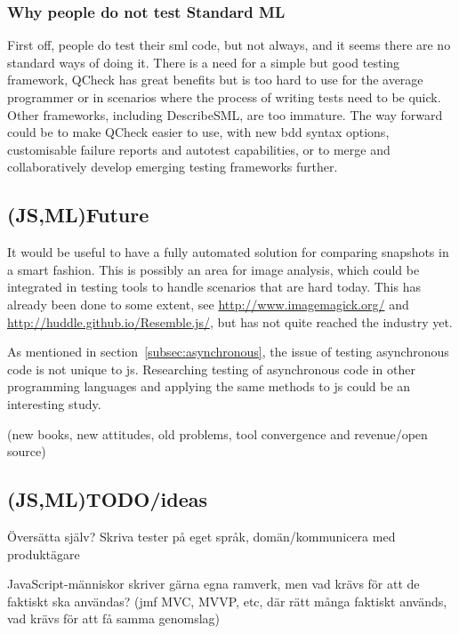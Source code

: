 \documentclass[11pt]{article}
\begin{document}
\subsubsection{Why people do not test Standard ML}
\label{subsubsec:whynotsml}

First off, people do test their \gls{sml} code, but not always, and it seems there are no standard ways of doing it. There is a need for a simple but good testing framework, QCheck has great benefits but is too hard to use for the average programmer or in scenarios where the process of writing tests need to be quick. Other frameworks, including DescribeSML, are too immature. The way forward could be to make QCheck easier to use, with new \gls{bdd} syntax options, customisable failure reports and autotest capabilities, or to merge and collaboratively develop emerging testing frameworks further.

\subsection{(JS,ML)Future}

It would be useful to have a fully automated solution for comparing snapshots in a smart fashion. This is possibly an area for image analysis, which could be integrated in testing tools to handle scenarios that are hard today. This has already been done to some extent, see \url{http://www.imagemagick.org/} and \url{http://huddle.github.io/Resemble.js/}, but has not quite reached the industry yet.

As mentioned in section~\ref{subsec:asynchronous}, the issue of testing asynchronous code is not unique to \gls{js}. Researching testing of asynchronous code in other programming languages and applying the same methods to \gls{js} could be an interesting study.

(new books, new attitudes, old problems, tool convergence and revenue/open source)

\subsection{(JS,ML)TODO/ideas}

Översätta själv? Skriva tester på eget språk, domän/kommunicera med produktägare

JavaScript-människor skriver gärna egna ramverk, men vad krävs för att de faktiskt ska användas? (jmf MVC, MVVP, etc, där rätt många faktiskt används, vad krävs för att få samma genomslag)
\end{document}
